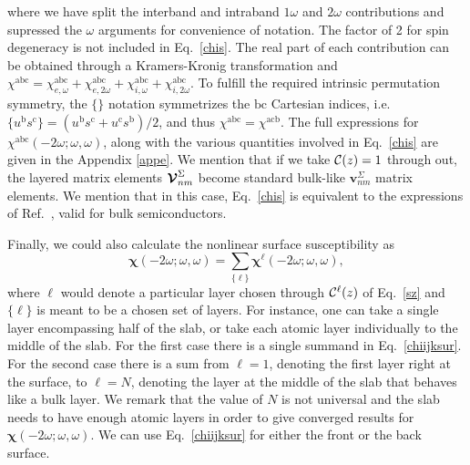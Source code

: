 \documentclass[floatfix,prb,aps,superscriptaddress,showpacs,11pt,preprint,letterpaper]{revtex4}
\begin{document}
where we have split the interband and intraband $1\omega$ and $2\omega$
contributions and supressed the $\omega$ arguments for 
convenience of notation.
The factor of 2 for spin degeneracy is not included in Eq.~\eqref{chis}. 
The real part of each contribution can be obtained through
a Kramers-Kronig transformation\cite{nicolasPRB14} and
$\chi^{\mathrm{a}\mathrm{b}\mathrm{c}}=
\chi^{\mathrm{a}\mathrm{b}\mathrm{c}}_{e,\omega} 
+\chi^{\mathrm{a}\mathrm{b}\mathrm{c}}_{e,2\omega}
+\chi^{\mathrm{a}\mathrm{b}\mathrm{c}}_{i,\omega} 
+\chi^{\mathrm{a}\mathrm{b}\mathrm{c}}_{i,2\omega}
$.
To fulfill the required intrinsic permutation symmetry, 
the $\{\}$ notation symmetrizes the $\mathrm{b}\mathrm{c}$ Cartesian indices, i.e. 
$\{u^{\mathrm{b}}s^{\mathrm{c}}\}=(u^{\mathrm{b}}s^{\mathrm{c}}+u^{\mathrm{c}}s^{\mathrm{b}})/2$,
and thus
$\chi^{\mathrm{a}\mathrm{b}\mathrm{c}}=\chi^{\mathrm{a}\mathrm{c}\mathrm{b}}$.
The full expressions for
$\chi^{\mathrm{a}\mathrm{b}\mathrm{c}}(-2\omega;\omega,\omega)$, along 
with the various quantities involved in Eq.~\eqref{chis} are given in
the Appendix \ref{appe}. 
We mention that if we take ${\mathbf{\cal C}}(z)=1$ through out, the layered
matrix elements $\boldsymbol{\mathcal{\cal V}}^{\Sigma}_{nm}$ become standard bulk-like
$\mathbf{v}^{\Sigma}_{nm}$ matrix elements. We mention that in this
case, Eq.~\eqref{chis} is equivalent to the expressions of
Ref.~, valid for bulk semiconductors.
 
Finally, we could also calculate the nonlinear surface susceptibility as 
\begin{equation}
\boldsymbol{\chi}(-2\omega;\omega,\omega)
= \sum_{\{\ell\}}\boldsymbol{\chi}^\ell(-2\omega;\omega,\omega),
\label{chiijksur}
\end{equation} 
where $\ell$ would denote a particular layer chosen through
${\mathbf{\cal C}}^\ell(z)$ of Eq.~\eqref{sz} and
$\{\ell\}$
is meant to be a chosen set of layers. For instance, 
one can take a single layer 
encompassing half of the slab, or take each 
atomic layer individually to the middle
of the slab. For the first case there is 
a single summand
in Eq.~\eqref{chiijksur}. For the second case
there is a sum from $\ell=1$, denoting the first layer 
right at the surface, to $\ell=N$, denoting the layer at the middle of the slab 
that behaves like a bulk layer.
We remark that the value of 
$N$ is not universal and
the slab needs to have enough atomic layers 
in order to give converged results for 
$\boldsymbol{\chi} (-2\omega;\omega,\omega)$. 
We can use Eq.~\eqref{chiijksur} for 
either the front or the back surface. 
\end{document}
